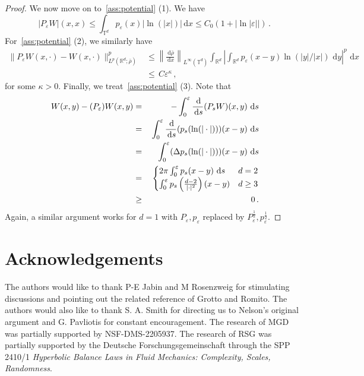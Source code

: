 \documentclass[a4paper,10pt,twoside]{amsart}
\newcommand{\dx}[1]{\,\mathrm{d}#1}  %
\theoremstyle{remark}
\theoremstyle{definition}
\numberwithin{equation}{section}
\newcommand{\T}{\mathbb{T}}
\newcommand{\eps}{\varepsilon}
\newcommand{\R}{\mathbb{R}}
\newcommand{\0}{{\bf 0}}
\newcommand{\+}{\hspace{-.5ex}+\hspace{-.5ex}}
\begin{document}
\begin{proof}
  We now move on to~\cref{ass:potential} (1). We have
  \begin{equation}
    |P_\eps W|(x,x) \leq \int_{\T^d}p_\eps (x)|\ln (|x|)|\dx{x}\leq C_0(1+ |\ln|\eps||)\, .
  \end{equation}
  For~\cref{ass:potential} (2), we similarly have
  \begin{align}
    \lVert P_\eps W(x,\cdot) - W(x,\cdot) \rVert_{L^p(\R^d;\bar{\rho})}^p &\leq  \left\lVert \frac{\dx{\bar{\rho}}}{\dx{x}}\right \rVert_{L^\infty(\T^d)} \int_{\R^d}\left|\int_{\R^d}p_\eps(x-y)\ln(|y|/|x|)\, \dx{y}\right|^p\, \dx{x}\\&\leq \, C\eps^\kappa \, ,
  \end{align}
  for some $\kappa>0$. Finally, we treat~\cref{ass:potential} (3). Note that
  \begin{eqnarray*}
      \, W(x,y)-(P_\eps)W(x,y)&=&\,\displaystyle -\int_0^\eps \frac{\dx}{\dx{s}}(P_s W)(x,y)\, \dx{s} \\
    &=&\displaystyle\,\int_0^\eps \frac{\dx}{\dx{s}}(p_s (\ln(|\cdot|)))(x-y)\, \dx{s} \\
    &=&\displaystyle\, \int_0^\eps (\Delta p_s (\ln(|\cdot|)))(x-y)\, \dx{s}\\
    &=&\displaystyle\,
    \begin{cases}
      2\pi \int_0^\eps p_s (x-y)\, \dx{s}& d=2 \\
      \int_0^\eps p_s \left(\frac{d-2}{|\cdot|^{2}}\right)(x-y)& d\geq 3
    \end{cases} \\
    &\geq & \, 0 \,.
  \end{eqnarray*}
 Again, a similar argument works for $d=1$  with $P_\eps,p_\eps$ replaced by $P_\eps^{\frac12},p_\eps^{\frac12}$.

\end{proof}

\section*{Acknowledgements}
The authors would like to thank P-E Jabin and M Rosenzweig for stimulating discussions and pointing out the related reference of Grotto and Romito. The authors would also like to thank S. A. Smith for directing us to Nelson's original argument and G. Pavliotis for constant encouragement.  The research of MGD was partially supported by NSF-DMS-2205937. The research of RSG was partially supported by the Deutsche Forschungsgemeinschaft through the SPP 2410/1 \emph{Hyperbolic Balance Laws in Fluid Mechanics: Complexity, Scales, Randomness}.



\end{document}
